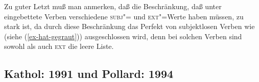 {Zu guter Letzt muß man anmerken, daß die Beschränkung, daß unter \haben eingebettete
Verben verschiedene \textsc{subj}"= und \textsc{ext}"=Werte haben müssen, zu stark ist,
da durch diese Beschränkung das Perfekt von subjektlosen Verben
wie  (siehe (\ref{ex-hat-gegraut})) ausgeschlossen wird, denn bei solchen Verben sind
sowohl \subj als auch \textsc{ext} die leere Liste. 






\subsection{Kathol: 1991 und Pollard: 1994}
\label{kathol-pollard}




}
